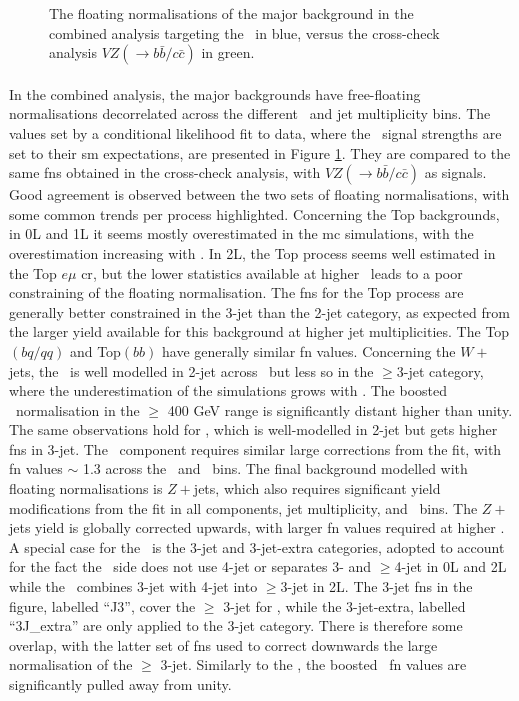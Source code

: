 \begin{figure}[h!]
    \caption{The floating normalisations of the major background in the combined analysis targeting the \vhbc\ in blue, versus the cross-check analysis $VZ(\rightarrow b\bar{b}/c\bar{c})$ in green.}
    \label{fig:FNback}
\end{figure} 

\paragraph{}In the combined analysis, the major backgrounds have free-floating normalisations decorrelated across the different \ptv\ and jet multiplicity bins. The values set by a conditional likelihood fit to data, where the \vhbc\ signal strengths are set to their \gls{sm} expectations, are presented in Figure \ref{fig:FNback}. They are compared to the same \glspl{fn} obtained in the cross-check analysis, with $VZ(\rightarrow b\bar{b}/c\bar{c})$ as signals. Good agreement is observed between the two sets of floating normalisations, with some common trends per process highlighted. Concerning the Top backgrounds, in 0L and 1L it seems mostly overestimated in the \gls{mc} simulations, with the overestimation increasing with \ptv. In 2L, the Top process seems well estimated in the Top $e\mu$ \gls{cr}, but the lower statistics available at higher \ptv\ leads to a poor constraining of the floating normalisation. The \glspl{fn} for the Top process are generally better constrained in the 3-jet than the 2-jet category, as expected from the larger yield available for this background at higher jet multiplicities. The Top$(bq/qq)$ and Top$(bb)$ have generally similar \gls{fn} values. Concerning the $W+$jets, the \whf\ is well modelled in 2-jet across \ptv\ but less so in the $\geq$3-jet category, where the underestimation of the simulations grows with \ptv. The boosted \whf\ normalisation in the $\geq$ 400 GeV range is significantly distant higher than unity. The same observations hold for \wlf, which is well-modelled in 2-jet but gets higher \glspl{fn} in 3-jet. The \wmf\ component requires similar large corrections from the fit, with \gls{fn} values $\sim$ 1.3 across the \nj\ and \ptv\ bins. The final background modelled with floating normalisations is $Z+$jets, which also requires significant yield modifications from the fit in all components, jet multiplicity, and \ptv\ bins. The $Z+$jets yield is globally corrected upwards, with larger \gls{fn} values required at higher \ptv. A special case for the \zhf\ is the 3-jet and 3-jet-extra categories, adopted to account for the fact the \vhc\ side does not use 4-jet or separates 3- and $\geq$4-jet in 0L and 2L while the \vhb\ combines 3-jet with 4-jet into $\geq$3-jet in 2L. The 3-jet \glspl{fn} in the figure, labelled ``J3'', cover the $\geq$ 3-jet for \vhb, while the 3-jet-extra, labelled ``3J\_extra'' are only applied to the 3-jet category. There is therefore some overlap, with the latter set of \glspl{fn} used to correct downwards the large normalisation of the $\geq$ 3-jet. Similarly to the \whf, the boosted \zhf\ \gls{fn} values are significantly pulled away from unity.
  
